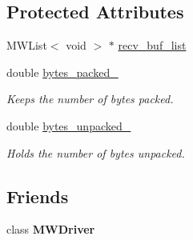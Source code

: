 \subsection*{Protected Attributes}
\begin{DoxyCompactItemize}
\item 
M\+W\+List$<$ void $>$ $\ast$ \hyperlink{classMWRMComm_ac0edce61ba0263a04a569df694397fe1}{recv\+\_\+buf\+\_\+list}
\item 
\mbox{\label{classMWRMComm_a859f4795dc121dcf92e5cd62b4447fe3}} 
double \hyperlink{classMWRMComm_a859f4795dc121dcf92e5cd62b4447fe3}{bytes\+\_\+packed\+\_\+}
\begin{DoxyCompactList}\small\item\em Keeps the number of bytes packed. \end{DoxyCompactList}\item 
\mbox{\label{classMWRMComm_a0af7c21bc9a76df3135ed4d638bbb514}} 
double \hyperlink{classMWRMComm_a0af7c21bc9a76df3135ed4d638bbb514}{bytes\+\_\+unpacked\+\_\+}
\begin{DoxyCompactList}\small\item\em Holds the number of bytes unpacked. \end{DoxyCompactList}\end{DoxyCompactItemize}
\subsection*{Friends}
\begin{DoxyCompactItemize}
\item 
\mbox{\label{classMWRMComm_ac3dcc3a36f06b163e83dc4661028cddd}} 
class {\bfseries M\+W\+Driver}
\end{DoxyCompactItemize}
